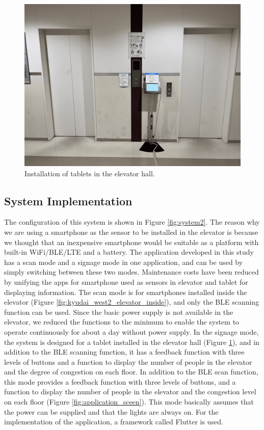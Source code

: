 \begin{figure}[t]
  \begin{center}
    \includegraphics[clip,  width=1.0\hsize]{img/kyudai_west2_elevator.png}
    \caption{Installation of tablets in the elevator hall.}
    \label{fig:kyudai_west2_elevator}
  \end{center}
\end{figure}

\subsection{System Implementation}

The configuration of this system is shown in Figure \ref{fig:system2}. The reason why we are using a smartphone as the sensor to be installed in the elevator is because we thought that an inexpensive smartphone would be suitable as a platform with built-in WiFi/BLE/LTE and a battery. The application developed in this study has a scan mode and a signage mode in one application, and can be used by simply switching between these two modes. Maintenance costs have been reduced by unifying the apps for smartphone used as sensors in elevator and tablet for displaying information. The scan mode is for smartphones installed inside the elevator (Figure \ref{fig:kyudai_west2_elevator_inside}), and only the BLE scanning function can be used. Since the basic power supply is not available in the elevator, we reduced the functions to the minimum to enable the system to operate continuously for about a day without power supply. In the signage mode, the system is designed for a tablet installed in the elevator hall (Figure \ref{fig:kyudai_west2_elevator}), and in addition to the BLE scanning function, it has a feedback function with three levels of buttons and a function to display the number of people in the elevator and the degree of congestion on each floor. In addition to the BLE scan function, this mode provides a feedback function with three levels of buttons, and a function to display the number of people in the elevator and the congestion level on each floor (Figure \ref{fig:application_sceen}). This mode basically assumes that the power can be supplied and that the lights are always on. For the implementation of the application, a framework called Flutter is used.


